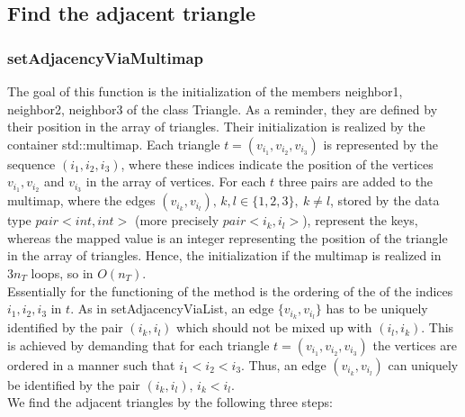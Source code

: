 \documentclass[10pt]{article}
\begin{document}
\subsection{Find the adjacent triangle}

\subsubsection{setAdjacencyViaMultimap} \label{multimap}

The goal of this function is the initialization of the members {\ttfamily neighbor1, neighbor2, neighbor3} of the class Triangle. As a reminder, they are defined by their position in the array of triangles. Their initialization is realized by the container {\ttfamily std::multimap}. 
Each triangle $ t = (v_{i_1},v_{i_2},v_{i_3}) $ is represented by the sequence $ (i_1,i_2,i_3) $, where these indices indicate the position of the vertices $v_{i_1},v_{i_2}$ and $v_{i_3}$ in the array of vertices. 
For each $ t $ three pairs are added to the multimap, where the edges $(v_{i_k},v_{i_l}), \, k,l \in \{1,2,3\}, \ k \neq l $, stored by the data type $ pair<int,int> $ (more precisely $ pair<i_k,i_l> $), represent the keys, whereas the mapped value is an integer representing the position of the triangle in the array of triangles. Hence, the initialization if the multimap is realized in $ 3n_T $ loops, so in $ O(n_T) $. \\
Essentially for the functioning of the method is the ordering of the of the indices $ i_1,i_2,i_3 $ in $ t $. As in {\ttfamily setAdjacencyViaList}, an edge $ \{ v_{i_k}, v_{i_l}\} $
 has to be uniquely identified by the pair $ (i_k,i_l) $ which should not be mixed up with $(i_l,i_k) $. This is achieved by demanding that for each triangle $ t =  (v_{i_1},v_{i_2},v_{i_3})$ the vertices are ordered in a manner such that $ i_1 < i_2 < i_3 $. Thus, an edge $(v_{i_k},v_{i_l}) $ can uniquely be identified by the pair $ (i_k,i_l), \, i_k < i_l $. \\
 We find the adjacent triangles by the following three steps: 
\end{document}
